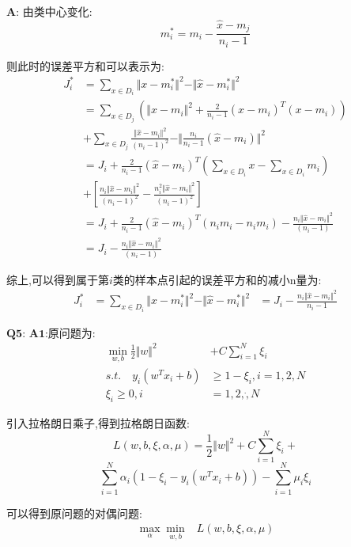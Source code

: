 \documentclass[homework]{IEEEtran}
\begin{document}
\begin{CJK}{UTF8}{gkai}
$$$$ \par
$\mathbf{A}$: 由类中心变化:
$$
m_{i}^{*} = m_i - \frac{\hat{x}-m_j}{n_i-1}
$$ \par
则此时的误差平方和可以表示为:
\begin{align*}
 J_{i}^{*} &= \sum\limits_{x\in D_i} \Vert x-m_{i}^{*} \Vert^{2} - \Vert \hat{x}-m_{i}^{*} \Vert^{2}	\\
	&=\sum\limits_{x\in D_j} \left(\Vert x-m_i \Vert^{2}+\frac{2}{n_i-1}(\hat{x}-m_i)^{T}(x-m_i) \right) \\
    &+\sum\limits_{x\in D_j} \frac{\Vert \hat{x}-m_i\Vert^{2}}{(n_i-1)^2} -\Vert \frac{n_i}{n_i-1} \left(\hat{x}-m_i \right) \Vert^{2}  \\
	&=J_i + \frac{2}{n_i-1}(\hat{x}-m_i)^{T}\left(\sum\limits_{x\in D_i}x-\sum\limits_{x\in D_i}m_i\right) \\
    &+\left[\frac{n_i \Vert \hat{x}-m_i\Vert^{2}}{(n_i-1)^2} - \frac{n_{i}^{2} \Vert \hat{x}-m_i\Vert^{2}}{(n_i-1)^2}\right]	\\
	&= J_i + \frac{2}{n_i-1}(\hat{x}-m_i)^{T}\left(n_i m_i - n_i m_i\right)-\frac{n_i \Vert \hat{x}-m_i\Vert^{2}}{(n_i-1)} \\
	&=J_i - \frac{n_i \Vert \hat{x}-m_i\Vert^{2}}{(n_i-1)}
\end{align*}\par
综上,可以得到属于第$i$类的样本点引起的误差平方和的减小n量为:
\begin{align*}
J_{i}^{*} &= \sum\limits_{x\in D_i} \Vert x-m_{i}^{*} \Vert ^{2} - \Vert \hat{x} -m_{i}^{*} \Vert^{2}
  &=J_i - \frac{n_i \Vert \hat{x}-m_i\Vert^{2}}{n_i - 1}
\end{align*}\par
$\mathbf{Q5}$:
$\mathbf{A1}$:原问题为:
\begin{align*}
    \min_{w,b}\frac{1}{2} \Vert w \Vert^{2} &+ C\sum\limits_{i=1}^{N}\xi_i \\
    s.t. \quad y_i\left( w^Tx_i+b\right) &\geq 1-\xi_i, i=1,2\dot,N \\
    \xi_i \geq 0, i &= 1,2,\dot,N
\end{align*}\par
引入拉格朗日乘子,得到拉格朗日函数:
$$
L\left(w,b,\xi,\alpha,\mu\right)=\frac{1}{2}\Vert w\Vert^{2} +C\sum\limits_{i=1}^{N}\xi_i+
$$
$$
\sum\limits_{i=1}^{N}\alpha_i \left( 1-\xi_i-y_i\left(w^Tx_i+b\right) \right) -\sum\limits_{i=1}^{N}\mu_i \xi_i
$$\par
可以得到原问题的对偶问题:
\begin{align*}
\max_{\alpha} \min_{w,b}&L\left( w,b,\xi,\alpha,\mu \right) \\

\end{align*}
\end{CJK}
\end{document}
